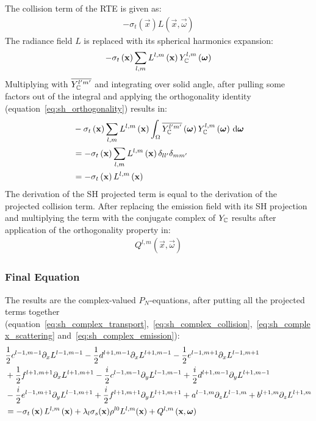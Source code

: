 The collision term of the RTE is given as:
\begin{align*}
-\sigma_t\left(\vec{x}\right)L\left(\vec{x}, \vec{\omega}\right)
\end{align*}
The radiance field $L$ is replaced with its spherical harmonics expansion:
\begin{align*}
-\sigma_t\left(\boldsymbol{\mathbf{x}}\right)
\sum_{l,m}
{
L^{l,m}\left(\boldsymbol{\mathbf{x}}\right )Y_{\mathbb{C}}^{l,m}\left(\boldsymbol{\mathbf{\omega}}\right)
}
\end{align*}
Multiplying with $\overline{Y_{\mathbb{C}}^{l'm'}}$ and integrating over solid angle, after pulling some factors out of the integral and applying the orthogonality identity (equation~\ref{eq:sh_orthogonality}) results in:
\begin{align}
&-\sigma_t\left(\boldsymbol{\mathbf{x}}\right)\sum_{l,m}{L^{l,m}\left(\boldsymbol{\mathbf{x}}\right )\int_\Omega\overline{Y_{\mathbb{C}}^{l'm'}}\left(\boldsymbol{\mathbf{\omega}}\right)Y_{\mathbb{C}}^{l,m}\left(\boldsymbol{\mathbf{\omega}}\right)\,\mathrm{d}\boldsymbol{\mathbf{\omega}}}
\nonumber
\\
&= -\sigma_t\left(\boldsymbol{\mathbf{x}}\right)\sum_{l,m}{L^{l,m}\left(\boldsymbol{\mathbf{x}}\right )\delta_{ll'}\delta_{mm'}}
\nonumber
\\
&= -\sigma_t\left(\boldsymbol{\mathbf{x}}\right)L^{l,m}\left(\boldsymbol{\mathbf{x}}\right )
\label{eq:sh_complex_collision}
\end{align}
The derivation of the SH projected term is equal to the derivation of the projected collision term. After replacing the emission field with its SH projection and multiplying the term with the conjugate complex of $Y_{\mathbb{C}}$ results after application of the orthogonality property in:
\begin{align}
Q^{l,m}\left(\vec{x}, \vec{\omega}\right)
\label{eq:sh_complex_emission}
\end{align}


\subsubsection*{Final Equation}

The results are the complex-valued $P_N$-equations, after putting all the projected terms together (equation~\ref{eq:sh_complex_transport},~\ref{eq:sh_complex_collision},~\ref{eq:sh_complex_scattering} and~\ref{eq:sh_complex_emission}):
\begin{align}
&
\frac{1}{2}c^{l-1, m-1}\partial_x L^{l-1,m-1}
-\frac{1}{2}d^{l+1, m-1}\partial_x L^{l+1,m-1}
-\frac{1}{2}e^{l-1, m+1}\partial_x L^{l-1,m+1}
\nonumber
\\
&
+\frac{1}{2}f^{l+1, m+1}\partial_x L^{l+1,m+1}
-\frac{i}{2}c^{l-1, m-1}\partial_y L^{l-1,m-1}
+\frac{i}{2}d^{l+1, m-1}\partial_y L^{l+1,m-1}
\nonumber
\\
&
-\frac{i}{2}e^{l-1, m+1}\partial_y L^{l-1,m+1}
+\frac{i}{2}f^{l+1, m+1}\partial_y L^{l+1,m+1}
+a^{l-1, m}\partial_z L^{l-1,m}
+b^{l+1, m}\partial_z L^{l+1,m}
\nonumber
\\
&
=
-\sigma_t\left(\boldsymbol{\mathbf{x}}\right)L^{l,m}\left(\boldsymbol{\mathbf{x}}\right )
+
\lambda_l
\sigma_s(\boldsymbol{\mathbf{x}})
\rho^{l0}L^{l,m}(\boldsymbol{\mathbf{x}}) + Q^{l,m}\left(\boldsymbol{\mathbf{x}}, \boldsymbol{\mathbf{\omega}}\right)
\label{eq:sh_pne_complex}
\end{align}